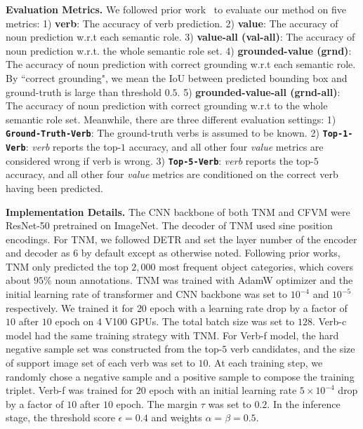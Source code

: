 \documentclass[letterpaper]{article} %
\begin{document}
\noindent \textbf{Evaluation Metrics.}
We followed prior work~\cite{pratt2020grounded} to evaluate our method on five metrics: 1) \textbf{verb}: The accuracy of verb prediction. 2) \textbf{value}: The accuracy of noun prediction w.r.t each semantic role. 3) \textbf{value-all (val-all)}: The accuracy of noun prediction w.r.t. the whole semantic role set. 4) \textbf{grounded-value (grnd)}: The accuracy of noun prediction with correct grounding w.r.t each semantic role. By ``correct grounding", we mean the IoU between predicted bounding box and ground-truth is large than threshold $0.5$. 5) \textbf{grounded-value-all (grnd-all)}: The accuracy of noun prediction with correct grounding w.r.t to the whole semantic role set. Meanwhile, there are three different evaluation settings: 1) \textbf{\texttt{Ground-Truth-Verb}}: The ground-truth verbs is assumed to be known. 2) \textbf{\texttt{Top-1-Verb}}: \emph{verb} reports the top-$1$ accuracy, and all other four \emph{value} metrics are considered wrong if verb is wrong. 3) \textbf{\texttt{Top-5-Verb}}: \emph{verb} reports the top-$5$ accuracy, and all other four \emph{value} metrics are conditioned on the correct verb having been predicted.



\noindent \textbf{Implementation Details.}
The CNN backbone of both TNM and CFVM were ResNet-50 pretrained on ImageNet. The decoder of TNM used sine position encodings. For TNM, we followed DETR and set the layer number of the encoder and decoder as $6$ by default except as otherwise noted. Following prior works, TNM only predicted the top $2,000$ most frequent object categories, which covers about $95\%$ noun annotations. TNM was trained with AdamW optimizer and the initial learning rate of transformer and CNN backbone was set to $10^{-4}$ and $10^{-5}$ respectively. We trained it for $20$ epoch with a learning rate drop by a factor of $10$ after $10$ epoch on $4$ V100 GPUs. The total batch size was set to $128$. Verb-c model had the same training strategy with TNM. For Verb-f model, the hard negative sample set was constructed from the top-$5$ verb candidates, and the size of support image set of each verb was set to $10$.
At each training step, we randomly chose a negative sample and a positive sample to compose the training triplet. Verb-f was trained for $20$ epoch with an initial learning rate $5 \times 10^{-4}$ drop by a factor of $10$ after $10$ epoch. The margin $\tau$ was set to $0.2$. In the inference stage, the threshold score $\epsilon=0.4$ and weights $\alpha = \beta = 0.5$.
\end{document}

